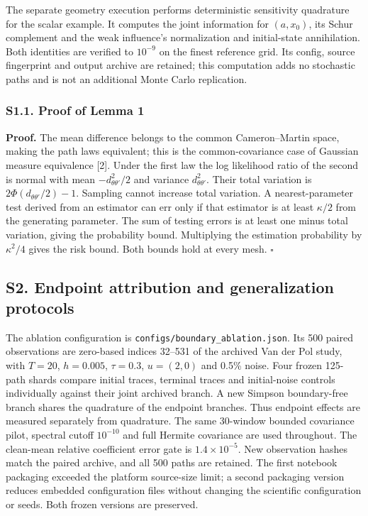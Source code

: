 \documentclass[
  american,
  11pt,
]{article}
\begin{document}
The separate geometry execution performs deterministic sensitivity
quadrature for the scalar example. It computes the joint information for
\((a,x_0)\), its Schur complement and the weak influence's normalization
and initial-state annihilation. Both identities are verified to
\(10^{-9}\) on the finest reference grid. Its config, source fingerprint
and output archive are retained; this computation adds no stochastic
paths and is not an additional Monte Carlo replication.

\subsubsection{S1.1. Proof of Lemma 1}\label{s1.1.-proof-of-lemma-1}

\textbf{Proof.} The mean difference belongs to the common
Cameron--Martin space, making the path laws equivalent; this is the
common-covariance case of Gaussian measure equivalence {[}2{]}. Under
the first law the log likelihood ratio of the second is normal with mean
\(-d_{\theta\theta'}^2/2\) and variance \(d_{\theta\theta'}^2\). Their
total variation is \(2\Phi(d_{\theta\theta'}/2)-1\). Sampling cannot
increase total variation. A nearest-parameter test derived from an
estimator can err only if that estimator is at least \(\kappa/2\) from
the generating parameter. The sum of testing errors is at least one
minus total variation, giving the probability bound. Multiplying the
estimation probability by \(\kappa^2/4\) gives the risk bound. Both
bounds hold at every mesh. \(\square\)

\subsection{S2. Endpoint attribution and generalization
protocols}\label{s2.-endpoint-attribution-and-generalization-protocols}

The ablation configuration is \texttt{configs/boundary\_ablation.json}.
Its 500 paired observations are zero-based indices 32--531 of the
archived Van der Pol study, with \(T=20\), \(h=0.005\), \(\tau=0.3\),
\(u=(2,0)\) and 0.5\% noise. Four frozen 125-path shards compare initial
traces, terminal traces and initial-noise controls individually against
their joint archived branch. A new Simpson boundary-free branch shares
the quadrature of the endpoint branches. Thus endpoint effects are
measured separately from quadrature. The same 30-window bounded
covariance pilot, spectral cutoff \(10^{-10}\) and full Hermite
covariance are used throughout. The clean-mean relative coefficient
error gate is \(1.4\times10^{-5}\). New observation hashes match the
paired archive, and all 500 paths are retained. The first notebook
packaging exceeded the platform source-size limit; a second packaging
version reduces embedded configuration files without changing the
scientific configuration or seeds. Both frozen versions are preserved.
\end{document}
